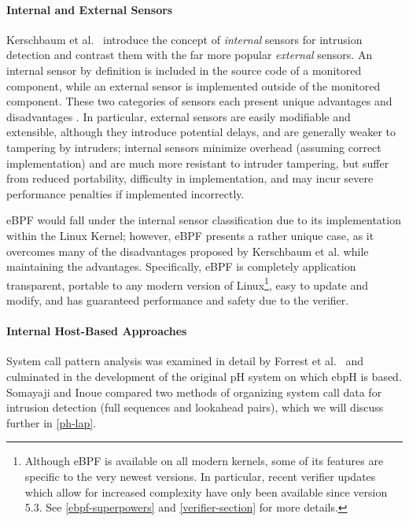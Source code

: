 \documentclass[
  12pt]{findlay}
\begin{document}
\hypertarget{internal-and-external-sensors}{%
\paragraph{Internal and External
Sensors}\label{internal-and-external-sensors}}

Kerschbaum et al.~\autocite{spafford02} introduce the concept of
\emph{internal} sensors for intrusion detection and contrast them with
the far more popular \emph{external} sensors. An internal sensor by
definition is included in the source code of a monitored component,
while an external sensor is implemented outside of the monitored
component. These two categories of sensors each present unique
advantages and disadvantages \autocite{spafford02}. In particular,
external sensors are easily modifiable and extensible, although they
introduce potential delays, and are generally weaker to tampering by
intruders; internal sensors minimize overhead (assuming correct
implementation) and are much more resistant to intruder tampering, but
suffer from reduced portability, difficulty in implementation, and may
incur severe performance penalties if implemented incorrectly.

eBPF would fall under the internal sensor classification
\autocite{spafford02} due to its implementation within the Linux Kernel;
however, eBPF presents a rather unique case, as it overcomes many of the
disadvantages proposed by Kerschbaum et al. while maintaining the
advantages. Specifically, eBPF is completely application transparent,
portable to any modern version of
Linux\footnote{Although eBPF is available on all modern kernels, some of its features are specific to the
very newest versions. In particular, recent verifier updates which allow for increased complexity have only been
available since version 5.3. See \autoref{ebpf-superpowers} and \autoref{verifier-section} for more details.},
easy to update and modify, and has guaranteed performance and safety due
to the verifier.

\hypertarget{internal-host-based-approaches}{%
\paragraph{Internal Host-Based
Approaches}\label{internal-host-based-approaches}}

System call pattern analysis was examined in detail by Forrest et
al.~\autocite{forrest96} and culminated in the development of the
original pH system \autocite{soma02} on which ebpH is based. Somayaji
and Inoue \autocite{soma07} compared two methods of organizing system
call data for intrusion detection (full sequences and lookahead pairs),
which we will discuss further in \autoref{ph-lap}.
\end{document}

